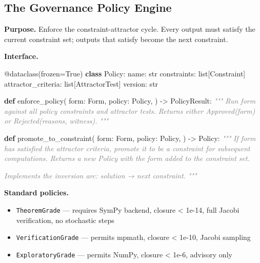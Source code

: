 \documentclass[11pt,a4paper]{article}
\newenvironment{Shaded}{\begin{snugshade}\small}{\end{snugshade}}
\newcommand{\KeywordTok}[1]{\textbf{#1}}
\newcommand{\CommentTok}[1]{\textit{\textcolor{gray}{#1}}}
\newcommand{\VariableTok}[1]{#1}
\newcommand{\OperatorTok}[1]{#1}
\newcommand{\BuiltInTok}[1]{#1}
\newcommand{\AttributeTok}[1]{#1}
\newcommand{\NormalTok}[1]{#1}
\providecommand{\tightlist}{\setlength{\itemsep}{0pt}\setlength{\parskip}{0pt}}
\begin{document}
\hypertarget{the-governance-policy-engine}{%
\subsection{The Governance Policy
Engine}\label{the-governance-policy-engine}}

\textbf{Purpose.} Enforce the constraint-attractor cycle. Every output
must satisfy the current constraint set; outputs that satisfy become the
next constraint.

\textbf{Interface.}

\begin{Shaded}
\begin{Highlighting}[]
\AttributeTok{@dataclass}\NormalTok{(frozen}\OperatorTok{=}\VariableTok{True}\NormalTok{)}
\KeywordTok{class}\NormalTok{ Policy:}
\NormalTok{    name: }\BuiltInTok{str}
\NormalTok{    constraints: }\BuiltInTok{list}\NormalTok{[Constraint]}
\NormalTok{    attractor\_criteria: }\BuiltInTok{list}\NormalTok{[AttractorTest]}
\NormalTok{    version: }\BuiltInTok{str}

\KeywordTok{def}\NormalTok{ enforce\_policy(}
\NormalTok{    form: Form,}
\NormalTok{    policy: Policy,}
\NormalTok{) }\OperatorTok{{-}\textgreater{}}\NormalTok{ PolicyResult:}
    \CommentTok{"""}
\CommentTok{    Run \textasciigrave{}form\textasciigrave{} against all policy constraints and attractor tests.}
\CommentTok{    Returns either Approved(form) or Rejected(reasons, witness).}
\CommentTok{    """}

\KeywordTok{def}\NormalTok{ promote\_to\_constraint(}
\NormalTok{    form: Form,}
\NormalTok{    policy: Policy,}
\NormalTok{) }\OperatorTok{{-}\textgreater{}}\NormalTok{ Policy:}
    \CommentTok{"""}
\CommentTok{    If \textasciigrave{}form\textasciigrave{} has satisfied the attractor criteria, promote it to be}
\CommentTok{    a constraint for subsequent computations. Returns a new Policy}
\CommentTok{    with the form added to the constraint set.}

\CommentTok{    Implements the inversion arc: solution → next constraint.}
\CommentTok{    """}
\end{Highlighting}
\end{Shaded}

\textbf{Standard policies.}

\begin{itemize}
\tightlist
\item
  \texttt{TheoremGrade} --- requires SymPy backend, closure \textless{}
  1e-14, full Jacobi verification, no stochastic steps
\item
  \texttt{VerificationGrade} --- permits mpmath, closure \textless{}
  1e-10, Jacobi sampling
\item
  \texttt{ExploratoryGrade} --- permits NumPy, closure \textless{} 1e-6,
  advisory only
\end{itemize}
\end{document}
